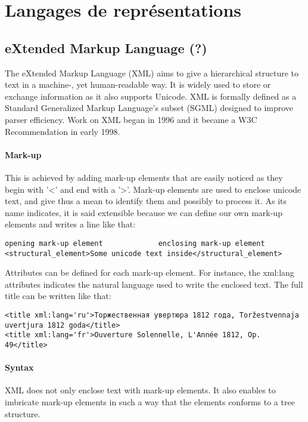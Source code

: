 \section{Langages de représentations}\label{s:mods}

\subsection{eXtended Markup Language (?)}
The eXtended Markup Language (XML) aims to give a hierarchical structure to  text in a machine-, yet human-readable way. It is widely used to store or exchange information as it also supports Unicode.
XML is formally defined as a Standard Generalized Markup Language's subset (SGML) designed to improve parser efficiency. Work on XML began in 1996 and it became a W3C Recommendation in early 1998.

\paragraph{Mark-up}
This is achieved by adding mark-up elements that are easily noticed as they begin with '<' and end with a '>'. Mark-up elements are used to enclose unicode text, and give thus a mean to identify them and possibly to process it. As its name indicates, it is said extensible because we can define our own mark-up elements and writes a line like that:

\begin{Verbatim}[fontsize=\small,formatcom=\color{black!70}]
opening mark-up element 			enclosing mark-up element
<structural_element>Some unicode text inside</structural_element>
\end{Verbatim}

Attributes can be defined for each mark-up element. 
For instance, the xml:lang attributes indicates the natural language used to write the enclosed text. The  full title can be written like that:
\begin{Verbatim}[fontsize=\small,formatcom=\color{black!70}]
<title xml:lang='ru'>Торжественная увертюра 1812 года, Toržestvennaja uvertjura 1812 goda</title>
<title xml:lang='fr'>Ouverture Solennelle, L'Année 1812, Op. 49</title>
\end{Verbatim}

\paragraph{Syntax}
XML does not only enclose text with mark-up elements. It also enables to imbricate mark-up elements in such a way that the elements conforms to a tree structure. 

